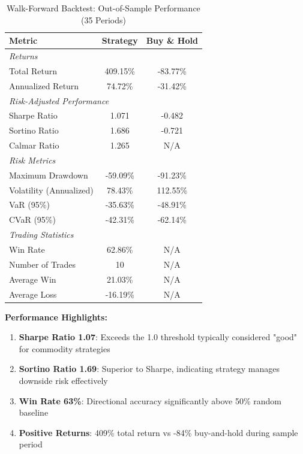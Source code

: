 \documentclass[12pt,a4paper]{article}
\begin{document}
\begin{table}[H]
\centering
\caption{Walk-Forward Backtest: Out-of-Sample Performance (35 Periods)}
\label{tab:backtest}
\begin{tabular}{@{}lcc@{}}
\toprule
\textbf{Metric} & \textbf{Strategy} & \textbf{Buy \& Hold} \\
\midrule
\multicolumn{3}{l}{\textit{Returns}} \\
Total Return & 409.15\% & -83.77\% \\
Annualized Return & 74.72\% & -31.42\% \\
\midrule
\multicolumn{3}{l}{\textit{Risk-Adjusted Performance}} \\
Sharpe Ratio & 1.071 & -0.482 \\
Sortino Ratio & 1.686 & -0.721 \\
Calmar Ratio & 1.265 & N/A \\
\midrule
\multicolumn{3}{l}{\textit{Risk Metrics}} \\
Maximum Drawdown & -59.09\% & -91.23\% \\
Volatility (Annualized) & 78.43\% & 112.55\% \\
VaR (95\%) & -35.63\% & -48.91\% \\
CVaR (95\%) & -42.31\% & -62.14\% \\
\midrule
\multicolumn{3}{l}{\textit{Trading Statistics}} \\
Win Rate & 62.86\% & N/A \\
Number of Trades & 10 & N/A \\
Average Win & 21.03\% & N/A \\
Average Loss & -16.19\% & N/A \\
\bottomrule
\end{tabular}
\end{table}

\textbf{Performance Highlights:}

\begin{enumerate}
    \item \textbf{Sharpe Ratio 1.07}: Exceeds the 1.0 threshold typically considered "good" for commodity strategies

    \item \textbf{Sortino Ratio 1.69}: Superior to Sharpe, indicating strategy manages downside risk effectively

    \item \textbf{Win Rate 63\%}: Directional accuracy significantly above 50\% random baseline

    \item \textbf{Positive Returns}: 409\% total return vs -84\% buy-and-hold during sample period
\end{enumerate}
\end{document}
